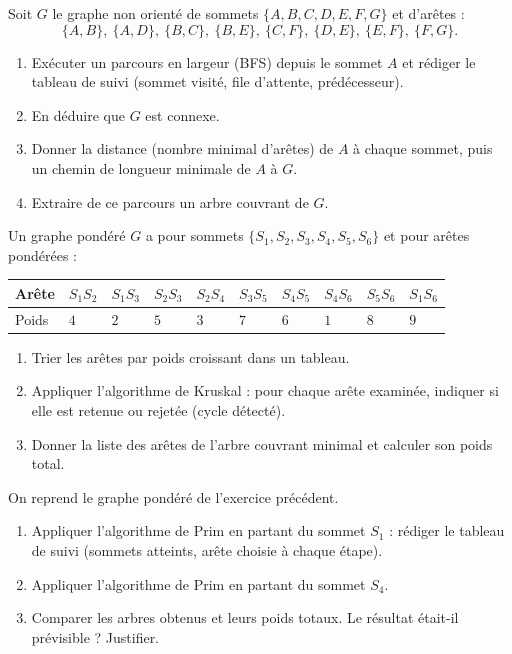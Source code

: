 \documentclass[11pt]{article}
\begin{document}
\begin{exercice}
Soit $G$ le graphe non orienté de sommets $\{A, B, C, D, E, F, G\}$ et d'arêtes :
\[ \{A,B\},\ \{A,D\},\ \{B,C\},\ \{B,E\},\ \{C,F\},\ \{D,E\},\ \{E,F\},\ \{F,G\}. \]
\begin{enumerate}
\item Exécuter un parcours en largeur (BFS) depuis le sommet $A$ et rédiger le tableau de suivi (sommet visité, file d'attente, prédécesseur).
\item En déduire que $G$ est connexe.
\item Donner la distance (nombre minimal d'arêtes) de $A$ à chaque sommet, puis un chemin de longueur minimale de $A$ à $G$.
\item Extraire de ce parcours un arbre couvrant de $G$.
\end{enumerate}
\end{exercice}

\begin{exercice}
Un graphe pondéré $G$ a pour sommets $\{S_1, S_2, S_3, S_4, S_5, S_6\}$ et pour arêtes pondérées :
\begin{center}
\begin{tabularx}{\linewidth}{|l|X|X|X|X|X|X|X|X|X|}
\hline
\rowcolor{popblueL} Arête & $S_1S_2$ & $S_1S_3$ & $S_2S_3$ & $S_2S_4$ & $S_3S_5$ & $S_4S_5$ & $S_4S_6$ & $S_5S_6$ & $S_1S_6$ \\
\hline
Poids & $4$ & $2$ & $5$ & $3$ & $7$ & $6$ & $1$ & $8$ & $9$ \\
\hline
\end{tabularx}
\end{center}
\begin{enumerate}
\item Trier les arêtes par poids croissant dans un tableau.
\item Appliquer l'algorithme de Kruskal : pour chaque arête examinée, indiquer si elle est retenue ou rejetée (cycle détecté).
\item Donner la liste des arêtes de l'arbre couvrant minimal et calculer son poids total.
\end{enumerate}
\end{exercice}

\begin{exercice}
On reprend le graphe pondéré de l'exercice précédent.
\begin{enumerate}
\item Appliquer l'algorithme de Prim en partant du sommet $S_1$ : rédiger le tableau de suivi (sommets atteints, arête choisie à chaque étape).
\item Appliquer l'algorithme de Prim en partant du sommet $S_4$.
\item Comparer les arbres obtenus et leurs poids totaux. Le résultat était-il prévisible ? Justifier.
\end{enumerate}
\end{exercice}
\end{document}
